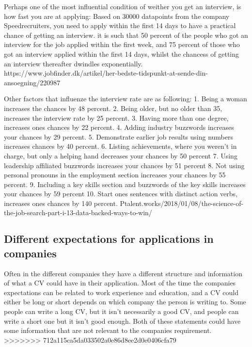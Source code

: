 Perhaps one of the most influential condition of weither you get an interview,
is how fast you are at applying:
Based on 30000 datapoints from the company Speedrecruiters, you need
to apply within the first 14 days to have a practical chance of getting an
interview. it is such that 50 percent of the people who got an interview
for the job applied within the first week, and 75 percent of those who
got an interview applied within the first 14 days, whilst the chancess of
getting an interview thereafter dwindles exponentially.
https://www.jobfinder.dk/artikel/her-bedste-tidspunkt-at-sende-din-ansoegning/220987

Other factors that influenze the interview rate are as following:
1. Being a woman increases the chances by 48 percent.
2. Being older, but no older than 35, increases the interview rate by 25 percent.
3. Having more than one degree, increases ones chances by 22 percent.
4. Adding industry buzzwords increases your chances by 29 percent.
5. Demonstrate earlier job results using numbers increases chances by 40 percent.
6. Listing achievements, where you weren't in charge, but only a helping hand
 decreases your chances by 50 percent
7. Using leadership affiliated buzzwords increases your chances by 51 percent
8. Not using personal pronouns in the employment section increases your
chances by 55 percent.
9. Including a key skills section and buzzwords of the key skills increases your
 chances by 59 percent
10. Start ones sentences with distinct action verbs, increases ones chances by 140 percent.
Ptalent.works/2018/01/08/the-science-of-the-job-search-part-i-13-data-backed-ways-to-win/








\subsection{Different expectations for applications in companies}
Often in the different companies they have a different structure and information of what a CV could have in their application.
Most of the time the companies expectations can be related to work experience and education,
and a CV could either be long or short depends on which company the person is writing to. Some people can write a long CV,
but it isn't necessarily a good CV, and people can write a short one but it isn't good enough.
Both of these statements could have some information that are not relevant to the companies requirement.
>>>>>>> 712a115ca5da033502a0e86d8ee2d0e0406cfa79

